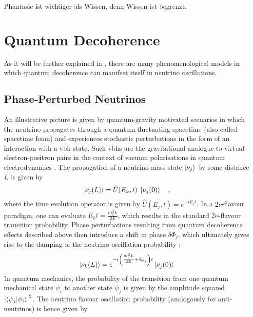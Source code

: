 \begin{savequote}[8cm]
\textlatin{Phantasie ist wichtiger als Wissen, denn Wissen ist
begrenzt.
  }
\end{savequote}

\chapter{Quantum Decoherence}
\minitoc
%
%
%
As it will be further explained in , there are many phenomenological models in which quantum decoherence can manifest itself in neutrino oscillations.

\section{Phase-Perturbed Neutrinos}
An illustrative picture is given by quantum-gravity motivated scenarios in which the neutrino propagates through a quantum-fluctuating spacetime (also called spacetime foam) and experiences stochastic perturbations in the form of an interaction with a \acrfull{vbh} state. Such \acrshort{vbh}s are the gravitational analogue to virtual electron-positron pairs in the context of vacuum polarisations in quantum electrodynamics \cite{QD_Stutt_Jens_2020}. The propagation of a neutrino mass state $\ket{\nu_j}$ by some distance $L$ is given by
%
\begin{align} \label{eq:nu_mass_propagation}
    \ket{\nu_j(L)} = \hat{U}(E_k, t) \ \ket{\nu_j (0)}
    \quad \text{,} 
\end{align}
%
where the time evolution operator is given by $\hat{U}(E_j, t) = e^{-i E_j t}$. In a $2\nu$-flavour paradigm, one can evaluate $E_k t = \frac{m_k^2 L}{2E}$, which results in the standard $2\nu$-flavour transition probability. Phase perturbations resulting from quantum decoherence effects described above then introduce a shift in phase $\delta \Phi_j$, which ultimately gives rise to the damping of the neutrino oscillation probability \cite{QD_Stutt_Jens_2020}:
%
\begin{align} \label{eq:nu_mass_propagation_perturbed}
    \ket{\nu_k(L)} = e^{-i \left( \frac{m_j^2 L}{2E} + \delta \phi_j \right) t} \ket{\nu_j (0)}
\end{align}
%
%
In quantum mechanics, the probability of the transition from one quantum mechanical state $\psi_i$ to another state $\psi_j$ is given by the amplitude squared $\left|\braket{\psi_j|\psi_i}\right|^2$. The neutrino flavour oscillation probability (analogously for anti-neutrinos) is hence given by
